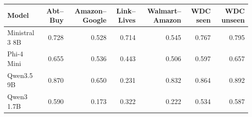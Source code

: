 \begin{tabular}{lrrrrrr}
\toprule
Model & Abt--Buy & Amazon--Google & Link--Lives & Walmart--Amazon & WDC seen & WDC unseen \\
\midrule
Ministral 3 8B & 0.728 & 0.528 & 0.714 & 0.545 & 0.767 & 0.795 \\
Phi-4 Mini & 0.655 & 0.536 & 0.443 & 0.506 & 0.597 & 0.657 \\
Qwen3.5 9B & 0.870 & 0.650 & 0.231 & 0.832 & 0.864 & 0.892 \\
Qwen3 1.7B & 0.590 & 0.173 & 0.322 & 0.222 & 0.534 & 0.587 \\
\bottomrule
\end{tabular}

